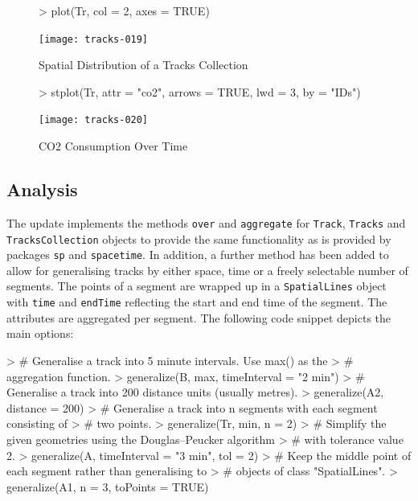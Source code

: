 \documentclass{article}
\newcommand{\code}[1]{{\tt #1}}
\begin{document}
\begin{figure}[H]
\centering
\begin{Schunk}
\begin{Sinput}
> plot(Tr, col = 2, axes = TRUE)
\end{Sinput}
\end{Schunk}
\texttt{[image: tracks-019]}
\caption{Spatial Distribution of a Tracks Collection}
\label{fig:spatialdistributionofatrackscollection}
\end{figure}

\begin{figure}[H]
\centering
\begin{Schunk}
\begin{Sinput}
> stplot(Tr, attr = "co2", arrows = TRUE, lwd = 3, by = "IDs")
\end{Sinput}
\end{Schunk}
\texttt{[image: tracks-020]}
\caption{CO2 Consumption Over Time}
\label{fig:co2consumptionovertime}
\end{figure}

\subsection{Analysis}

The update implements the methods \code{over} and \code{aggregate} for \code{Track}, \code{Tracks} and \code{TracksCollection} objects to provide the same functionality as is provided by packages \code{sp} and \code{spacetime}. In addition, a further method has been added to allow for generalising tracks by either space, time or a freely selectable number of segments. The points of a segment are wrapped up in a \code{SpatialLines} object with \code{time} and \code{endTime} reflecting the start and end time of the segment. The attributes are aggregated per segment. The following code snippet depicts the main options:

\begin{Schunk}
\begin{Sinput}
> # Generalise a track into 5 minute intervals. Use max() as the
> # aggregation function.
> generalize(B, max, timeInterval = "2 min")
> # Generalise a track into 200 distance units (usually metres).
> generalize(A2, distance = 200)
> # Generalise a track into n segments with each segment consisting of
> # two points.
> generalize(Tr, min, n = 2)
> # Simplify the given geometries using the Douglas–Peucker algorithm
> # with tolerance value 2.
> generalize(A, timeInterval = "3 min", tol = 2)
> # Keep the middle point of each segment rather than generalising to
> # objects of class "SpatialLines".
> generalize(A1, n = 3, toPoints = TRUE)
\end{Sinput}
\end{Schunk}
\end{document}
